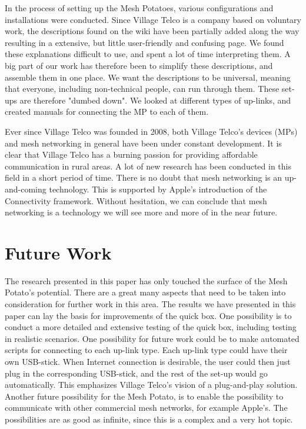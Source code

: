 In the process of setting up the Mesh Potatoes, various configurations and installations were conducted. Since Village Telco is a company based on voluntary work, the descriptions found on the wiki have been partially added along the way resulting in a extensive, but little user-friendly and confusing page. We found these explanations difficult to use, and spent a lot of time interpreting them. A big part of our work has therefore been to simplify these descriptions, and assemble them in one place. We want the descriptions to be universal, meaning that everyone, including non-technical people, can run through them. These set-ups are therefore "dumbed down". We looked at different types of up-links, and created manuals for connecting the MP to each of them. 

Ever since Village Telco was founded in 2008, both Village Telco's devices (MPs) and mesh networking in general have been under constant development. It is clear that Village Telco has a burning passion for providing affordable communication in rural areas. A lot of new research has been conducted in this field in a short period of time. There is no doubt that mesh networking is an up-and-coming technology. This is supported by Apple's introduction of the Connectivity framework. Without hesitation, we can conclude that mesh networking is a technology we will see more and more of in the near future.  

\section{Future Work}
The research presented in this paper has only touched the surface of the Mesh Potato's potential. There are a great many aspects that need to be taken into consideration for further work in this area. The results we have presented in this paper can lay the basis for improvements of the \gls{quick} box. One possibility is to conduct a more detailed and extensive testing of the \gls{quick} box, including testing in realistic scenarios. One possibility for future work could be to make automated scripts for connecting to each up-link type. Each up-link type could have their own USB-stick. When Internet connection is desirable, the user could then just plug in the corresponding USB-stick, and the rest of the set-up would go automatically. This emphasizes Village Telco's vision of a plug-and-play solution. Another future possibility for the Mesh Potato, is to enable the possibility to communicate with other commercial mesh networks, for example Apple's. The possibilities are as good as infinite, since this is a complex and a very hot topic.

